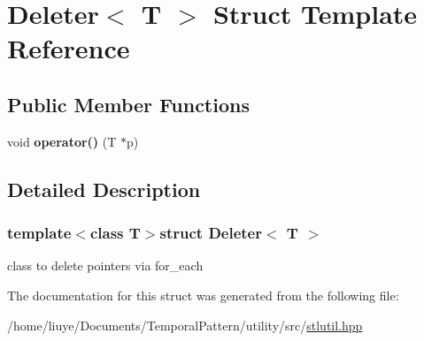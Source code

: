\hypertarget{struct_deleter}{}\section{Deleter$<$ T $>$ Struct Template Reference}
\label{struct_deleter}
\subsection*{Public Member Functions}
\begin{DoxyCompactItemize}
\item 
\hypertarget{struct_deleter_a41b54e03f57e6c3e447550d3d4e4b312}{}void {\bfseries operator()} (T $\ast$p)\label{struct_deleter_a41b54e03f57e6c3e447550d3d4e4b312}

\end{DoxyCompactItemize}


\subsection{Detailed Description}
\subsubsection*{template$<$class T$>$struct Deleter$<$ T $>$}

class to delete pointers via for\+\_\+each 

The documentation for this struct was generated from the following file\+:\begin{DoxyCompactItemize}
\item 
/home/liuye/\+Documents/\+Temporal\+Pattern/utility/src/\hyperlink{stlutil_8hpp}{stlutil.\+hpp}\end{DoxyCompactItemize}
